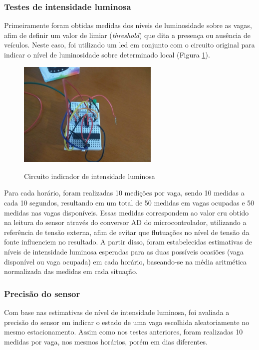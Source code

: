 \documentclass[oneside,openright,12pt]{ufsm_2015} %
\begin{document}
    \subsubsection{Testes de intensidade luminosa}
    Primeiramente foram obtidas medidas dos níveis de luminosidade sobre as vagas, afim de definir um valor de limiar (\textit{threshold}) que dita a presença ou ausência de veículos. Neste caso, foi utilizado um led em conjunto com o circuito original para indicar o nível de luminosidade sobre determinado local (Figura \ref{fig:led-indicator}).
    
    \begin{figure}[H]
     	    \caption{\label{exepretex} Circuito indicador de intensidade luminosa}
            \centering
            \includegraphics[width=0.6\textwidth]{figuras/indicador.jpg}
            \vspace{\baselineskip} %
            \label{fig:led-indicator}
    \end{figure}
    
    Para cada horário, foram realizadas 10 medições por vaga, sendo 10 medidas a cada 10 segundos, resultando em um total de 50 medidas em vagas ocupadas e 50 medidas nas vagas disponíveis. Essas medidas correspondem ao valor cru obtido na leitura do sensor através do conversor AD do microcontrolador, utilizando a referência de tensão externa, afim de evitar que flutuações no nível de tensão da fonte influenciem no resultado. A partir disso, foram estabelecidas estimativas de níveis de intensidade luminosa esperadas para as duas possíveis ocasiões (vaga disponível ou vaga ocupada) em cada horário, baseando-se na média aritmética normalizada das medidas em cada situação. 
    
    \subsubsection{Precisão do sensor}
    Com base nas estimativas de nível de intensidade luminosa, foi avaliada a precisão do sensor em indicar o estado de uma vaga escolhida aleatoriamente no mesmo estacionamento. Assim como nos testes anteriores, foram realizadas 10 medidas por vaga, nos mesmos horários, porém em dias diferentes. 
    
\end{document}
